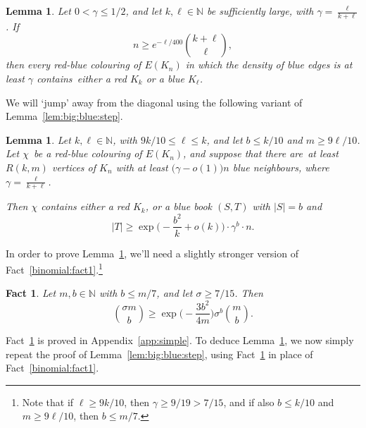 \documentclass[12pt,reqno]{amsart}
\newtheorem{lemma}[theorem]{Lemma}
\newtheorem{fact}[theorem]{Fact}
\theoremstyle{definition}
\theoremstyle{remark}
\newcommand\N{\mathbb{N}}
\renewcommand{\le}{\leqslant}
\renewcommand{\ge}{\geqslant}
\def\N{\mathbb{N}}
\begin{document}
\begin{lemma}\label{lem:off:diagonal:full:range:good:density}
Let $0 < \gamma \le 1/2$, and let $k,\ell \in \N$ be sufficiently large, with $\gamma = \frac{\ell}{k+\ell}$. If
$$n \ge e^{-\ell/400} {k + \ell \choose \ell},$$
then every red-blue colouring of\/ $E(K_n)$ in which the density of blue edges is at least\/ $\gamma$ contains~either a red $K_k$ or a blue $K_\ell$. 
\end{lemma}

We will `jump' away from the diagonal using the following variant of Lemma~\ref{lem:big:blue:step}. 

\begin{lemma}\label{lem:big:blue:step:repeat}
Let\/ $k,\ell \in \N$, with\/ $9k/10 \le \ell \le k$, and let\/ $b \le k/10$ and\/ $m \ge 9\ell/10$. Let $\chi$~be a red-blue colouring of\/ $E(K_n)$, and suppose that there are~at least\/ $R(k,m)$ vertices of $K_n$ with at least\/ $\big( \gamma - o(1) \big) n$ blue neighbours, where $\gamma = \frac{\ell}{k+\ell}$. 

Then\/ $\chi$ contains either a red $K_k$, or a blue book $(S,T)$ with $|S| = b$ and 
$$|T| \ge \exp\bigg( - \frac{b^2}{k} + o(k) \bigg) \cdot \gamma^b \cdot n.$$
\end{lemma}

In order to prove Lemma~\ref{lem:big:blue:step:repeat}, we'll need a slightly stronger version of Fact~\ref{binomial:fact1}.\footnote{Note that if $\ell \ge 9k/10$, then $\gamma \ge 9/19 > 7/15$, and if also $b \le k/10$ and $m \ge 9\ell/10$, then $b \le m/7$.}

\begin{fact}\label{binomial:fact1:stronger}
Let $m,b \in \N$ with $b \le m/7$, and let $\sigma \ge 7/15$. Then
$${\sigma m \choose b} \ge \exp\bigg( - \frac{3b^2}{4 m} \bigg) \sigma^b {m \choose b}.$$ 
\end{fact}

Fact~\ref{binomial:fact1:stronger} is proved in Appendix~\ref{app:simple}. To deduce Lemma~\ref{lem:big:blue:step:repeat}, we now simply repeat the proof of Lemma~\ref{lem:big:blue:step}, using Fact~\ref{binomial:fact1:stronger} in place of Fact~\ref{binomial:fact1}. 

\pagebreak
\end{document}
